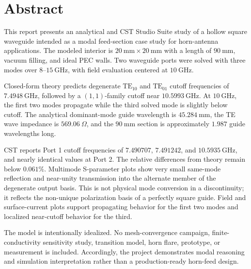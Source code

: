 
\chapter*{Abstract}
\thispagestyle{fancy}
\begingroup
\setlength{\emergencystretch}{2em}

This report presents an analytical and CST Studio Suite study of a hollow square waveguide intended as a modal feed-section case study for horn-antenna applications. The modeled interior is \(20~\mathrm{mm}\times20~\mathrm{mm}\) with a length of \(90~\mathrm{mm}\), vacuum filling, and ideal PEC walls. Two waveguide ports were solved with three modes over \(8\)--\(15~\mathrm{GHz}\), with field evaluation centered at \(10~\mathrm{GHz}\).

Closed-form theory predicts degenerate \(\mathrm{TE}_{10}\) and \(\mathrm{TE}_{01}\) cutoff frequencies of \(7.4948~\mathrm{GHz}\), followed by a \((1,1)\)-family cutoff near \(10.5993~\mathrm{GHz}\). At \(10~\mathrm{GHz}\), the first two modes propagate while the third solved mode is slightly below cutoff. The analytical dominant-mode guide wavelength is \(45.284~\mathrm{mm}\), the TE wave impedance is \(569.06~\Omega\), and the \(90~\mathrm{mm}\) section is approximately \(1.987\) guide wavelengths long.

CST reports Port 1 cutoff frequencies of \(7.490707\), \(7.491242\), and \(10.5935~\mathrm{GHz}\), and nearly identical values at Port 2. The relative differences from theory remain below \(0.061\%\). Multimode S-parameter plots show very small same-mode reflection and near-unity transmission into the alternate member of the degenerate output basis. This is not physical mode conversion in a discontinuity; it reflects the non-unique polarization basis of a perfectly square guide. Field and surface-current plots support propagating behavior for the first two modes and localized near-cutoff behavior for the third.

The model is intentionally idealized. No mesh-convergence campaign, finite-conductivity sensitivity study, transition model, horn flare, prototype, or measurement is included. Accordingly, the project demonstrates modal reasoning and simulation interpretation rather than a production-ready horn-feed design.
\par\endgroup
